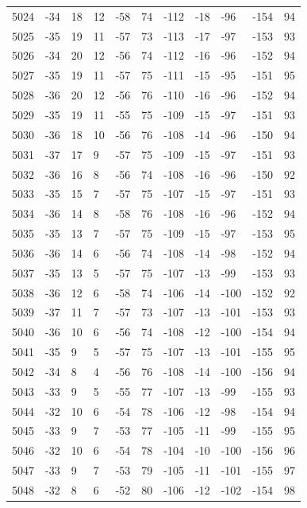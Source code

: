 \begin{table}[H]
\begin{tabular}{lllllllllll}
5024 & -34 & 18 & 12 & -58 & 74 & -112 & -18 & -96 & -154 & 94 \\
5025 & -35 & 19 & 11 & -57 & 73 & -113 & -17 & -97 & -153 & 93 \\
5026 & -34 & 20 & 12 & -56 & 74 & -112 & -16 & -96 & -152 & 94 \\
5027 & -35 & 19 & 11 & -57 & 75 & -111 & -15 & -95 & -151 & 95 \\
5028 & -36 & 20 & 12 & -56 & 76 & -110 & -16 & -96 & -152 & 94 \\
5029 & -35 & 19 & 11 & -55 & 75 & -109 & -15 & -97 & -151 & 93 \\
5030 & -36 & 18 & 10 & -56 & 76 & -108 & -14 & -96 & -150 & 94 \\
5031 & -37 & 17 & 9 & -57 & 75 & -109 & -15 & -97 & -151 & 93 \\
5032 & -36 & 16 & 8 & -56 & 74 & -108 & -16 & -96 & -150 & 92 \\
5033 & -35 & 15 & 7 & -57 & 75 & -107 & -15 & -97 & -151 & 93 \\
5034 & -36 & 14 & 8 & -58 & 76 & -108 & -16 & -96 & -152 & 94 \\
5035 & -35 & 13 & 7 & -57 & 75 & -109 & -15 & -97 & -153 & 95 \\
5036 & -36 & 14 & 6 & -56 & 74 & -108 & -14 & -98 & -152 & 94 \\
5037 & -35 & 13 & 5 & -57 & 75 & -107 & -13 & -99 & -153 & 93 \\
5038 & -36 & 12 & 6 & -58 & 74 & -106 & -14 & -100 & -152 & 92 \\
5039 & -37 & 11 & 7 & -57 & 73 & -107 & -13 & -101 & -153 & 93 \\
5040 & -36 & 10 & 6 & -56 & 74 & -108 & -12 & -100 & -154 & 94 \\
5041 & -35 & 9 & 5 & -57 & 75 & -107 & -13 & -101 & -155 & 95 \\
5042 & -34 & 8 & 4 & -56 & 76 & -108 & -14 & -100 & -156 & 94 \\
5043 & -33 & 9 & 5 & -55 & 77 & -107 & -13 & -99 & -155 & 93 \\
5044 & -32 & 10 & 6 & -54 & 78 & -106 & -12 & -98 & -154 & 94 \\
5045 & -33 & 9 & 7 & -53 & 77 & -105 & -11 & -99 & -155 & 95 \\
5046 & -32 & 10 & 6 & -54 & 78 & -104 & -10 & -100 & -156 & 96 \\
5047 & -33 & 9 & 7 & -53 & 79 & -105 & -11 & -101 & -155 & 97 \\
5048 & -32 & 8 & 6 & -52 & 80 & -106 & -12 & -102 & -154 & 98 \\

\end{tabular}
\end{table}
